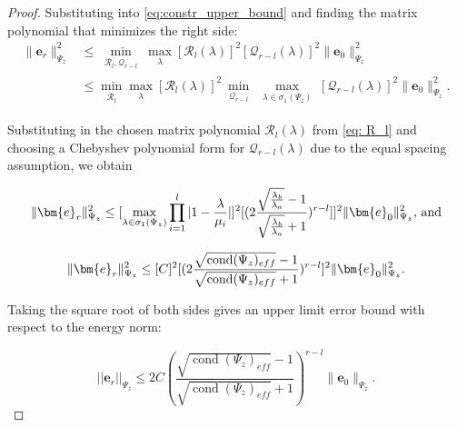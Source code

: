 \documentclass[11p]{elsarticle}
\numberwithin{equation}{section}
\newcommand{\vect}[1]{\ensuremath{\bm{#1}}}
\begin{document}
\begin{proof}
    Substituting into \eqref{eq:constr_upper_bound} and finding the matrix polynomial that minimizes the right side:
    \begin{align}
    \| \vect{e}_r\|_{\Psi_{z}}^2 
    &\leq \min\limits_{\substack{\mathcal{R}_l,\mathcal{Q}_{r-l}}} \max\limits_{\substack{\lambda}}[\mathcal{R}_l(\lambda)]^2[\mathcal{Q}_{r-l}(\lambda)]^2 \| \vect{e}_0\|_{\Psi_{z}}^2 \\
    &\leq \min\limits_{\substack{\mathcal{R}_l}} \max\limits_{\substack{\lambda}}[\mathcal{R}_l(\lambda)]^2\min\limits_{\substack{\mathcal{Q}_{r-l}}} \max\limits_{\substack{\lambda \in \sigma_1(\Psi_{z})}}[\mathcal{Q}_{r-l}(\lambda)]^2 \| \vect{e}_0\|_{\Psi_{z}}^2.
    \end{align}

    Substituting in the chosen matrix polynomial $\mathcal{R}_l(\lambda)$ from \eqref{eq: R_l} and choosing a Chebyshev polynomial form for $\mathcal{Q}_{r-l}(\lambda)$ due to the equal spacing assumption, we obtain

    \begin{equation}
    \| \vect{e}_r\|_{\Psi_{z}}^2 \leq [\max\limits_{\substack{\lambda \in \sigma_1(\Psi_{z})}} \prod_{i=1}^{l} | 1-\frac{\lambda}{\mu_i}|]^2[(2\frac{\sqrt{\frac{\lambda_b}{\lambda_a}} - 1}{\sqrt{\frac{\lambda_b}{\lambda_a}} +1})^{r-l}]]^2 \| \vect{e}_0\|_{\Psi_{z}}^2 \text{, and}\\
    \end{equation}

    \begin{equation}
    \| \vect{e}_r\|_{\Psi_{z}}^2 \leq [C]^2
    [(2\frac{\sqrt{\operatorname{cond}(\Psi_{z})_{eff}} - 1}{\sqrt{\operatorname{cond}(\Psi_{z})_{eff}} +1})^{r-l}]^2 \| \vect{e}_0\|_{\Psi_{z}}^2 .\\
    \end{equation}

    Taking the square root of both sides gives an upper limit error bound with respect to the energy norm:

    \begin{equation}
    ||\vect{e}_r||_{\Psi_{z}} \leq 2C(\frac{\sqrt{\operatorname{cond}(\Psi_{z})_{eff}} - 1}{\sqrt{\operatorname{cond}(\Psi_{z})_{eff}} +1})^{r-l} \| \vect{e}_0\|_{\Psi_{z}}.
    \end{equation}
\end{proof}
\end{document}

